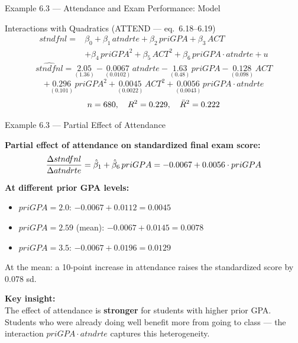 \documentclass[aspectratio=169, 12pt]{beamer}
\begin{document}
\begin{frame}[shrink=8]{Example 6.3 --- Attendance and Exam Performance: Model}

  \begin{examplebox}{Interactions with Quadratics (ATTEND --- eq.\ 6.18--6.19)}
    \[
      \begin{aligned}
        stndfnl = {}& \beta_0 + \beta_1\, atndrte + \beta_2\, priGPA + \beta_3\, ACT \\
          &+ \beta_4\, priGPA^2 + \beta_5\, ACT^2 + \beta_6\, priGPA \cdot atndrte + u
      \end{aligned}
    \]
    \[
      \widehat{stndfnl} = \underset{(1.36)}{2.05}
        - \underset{(0.0102)}{0.0067}\, atndrte
        - \underset{(0.48)}{1.63}\, priGPA
        - \underset{(0.098)}{0.128}\, ACT
    \]
    \[
      + \underset{(0.101)}{0.296}\, priGPA^2
      + \underset{(0.0022)}{0.0045}\, ACT^2
      + \underset{(0.0043)}{0.0056}\, priGPA \cdot atndrte
    \]
    \[
      n = 680, \quad R^2 = 0.229, \quad \bar{R}^2 = 0.222
    \]
  \end{examplebox}

\end{frame}

\begin{frame}[shrink=8]{Example 6.3 --- Partial Effect of Attendance}

  \begin{keybox}
    \textbf{Partial effect of attendance on standardized final exam score:}
    \[
      \frac{\Delta stndfnl}{\Delta atndrte} = \hat{\beta}_1 + \hat{\beta}_6\, priGPA
      = -0.0067 + 0.0056 \cdot priGPA
    \]
  \end{keybox}

  \medskip

      \textbf{At different prior GPA levels:}
      \begin{itemize}
        \item $priGPA = 2.0$: $-0.0067 + 0.0112 = 0.0045$
        \item $priGPA = 2.59$ (mean): $-0.0067 + 0.0145 = 0.0078$
        \item $priGPA = 3.5$: $-0.0067 + 0.0196 = 0.0129$
      \end{itemize}

      \medskip

      At the mean: a 10-point increase in attendance
      raises the standardized score by 0.078 sd.
  \medskip

      \begin{highlightbox}
        \textbf{Key insight:} \\
        The effect of attendance is \textbf{stronger} for students
        with higher prior GPA. \\[4pt]
        Students who were already doing well benefit more
        from going to class --- the interaction $priGPA \cdot atndrte$
        captures this heterogeneity.
      \end{highlightbox}

\end{frame}
\end{document}
